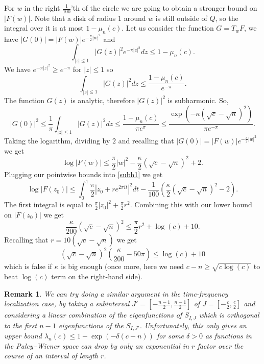 \documentclass[12pt]{amsart}
\numberwithin{equation}{section}
\newtheorem{remark}[Thm]{Remark}
\begin{document}
For $w$ in the right $\frac{1}{100}$'th of the circle we are going to obtain a stronger bound on $|F(w)|$. Note that a disk of radius $1$ around $w$ is still outside of $Q$, so the integral over it is at most $1-\mu_n(c)$. Let us consider the function $G=T_w F$, we have $|G(0)| = |F(w)|e^{-\frac{\pi}{2}|w|^2}$ and 
$$\int_{|z|\le 1} |G(z)|^2e^{-\pi |z|^2}dz \le 1-\mu_n(c).$$
We have $e^{-\pi |z|^2} \ge e^{-\pi}$ for $|z| \le 1$ so
$$\int_{|z|\le 1}|G(z)|^2 dz\le \frac{1-\mu_n(c)}{e^{-\pi}}.$$
The function $G(z)$ is analytic, therefore $|G(z)|^2$ is subharmonic. So, 
$$|G(0)|^2 \le \frac{1}{\pi} \int_{|z|\le 1}|G(z)|^2dz \le \frac{1-\mu_n(c)}{\pi e^{\pi}}\le \frac{\exp(-\kappa (\sqrt{c}-\sqrt{n})^2)}{\pi e^{-\pi}}.$$
Taking the logarithm, dividing by $2$ and recalling that $|G(0)| = |F(w)|e^{-\frac{\pi}{2}|w|^2}$ we get
$$\log |F(w)| \le \frac{\pi}{2}|w|^2 - \frac{\kappa}{2}(\sqrt{c}-\sqrt{n})^2 +2.$$
Plugging our pointwise bounds into \eqref{subh1} we get
$$\log |F(z_0)| \le \int_0^1 \frac{\pi}{2} |z_0+re^{2\pi i t}|^2dt - \frac{1}{100} \left(\frac{\kappa}{2}(\sqrt{c}-\sqrt{n})^2-2\right).$$
The first integral is equal to $\frac{\pi}{2}|z_0|^2 + \frac{\pi}{2}r^2$. Combining this with our lower bound on $|F(z_0)|$ we get
$$\frac{\kappa}{200}(\sqrt{c}-\sqrt{n})^2 \le \frac{\pi}{2}r^2 + \log(c) + 10.$$
Recalling that $r = 10(\sqrt{c}-\sqrt{n})$ we get
$$(\sqrt{c}-\sqrt{n})^2\left(\frac{\kappa}{200}-50\pi\right) \le \log(c) +10$$
which is false if $\kappa$ is big enough (once more, here we need $c-n\ge \sqrt{c\log(c)}$ to beat $\log(c)$ term on the right-hand side).
\begin{remark}
We can try doing a similar argument in the time-frequency localization case, by taking a subinterval $J'=[-\frac{n-1}{2},\frac{n-1}{2}]$ of $J=[-\frac{c}{2},\frac{c}{2}]$ and considering a linear combination of the eigenfunctions of $S_{I,J}$ which is orthogonal to the first $n-1$ eigenfunctions of the  $S_{I,J'}$. Unfortunately, this only gives an upper bound $\lambda_n(c)\le 1 - \exp(-\delta(c-n))$ for some $\delta > 0$ as functions in the Paley--Wiener space can drop by only an exponential in $r$ factor over the course of an interval of length $r$.
\end{remark}
\end{document}
